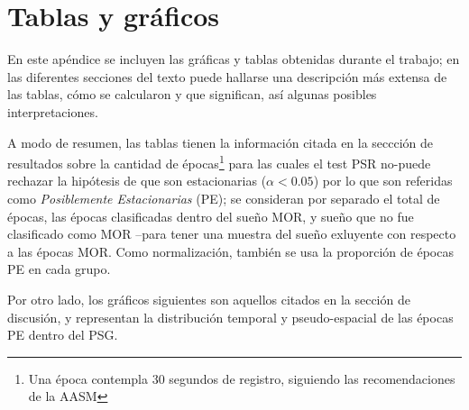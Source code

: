 \chapter{Tablas y gr\'aficos}

En este ap\'endice se incluyen las gr\'aficas y tablas obtenidas durante el trabajo; en las 
diferentes secciones del texto 
puede hallarse una descripci\'on m\'as extensa de las tablas,
c\'omo se
calcularon y que significan, as\'i algunas posibles interpretaciones.

A modo de resumen, las tablas tienen la informaci\'on citada en la seccci\'on de resultados sobre
la cantidad de \'epocas\footnote{Una \'epoca contempla 30 segundos de registro, siguiendo las
recomendaciones de la AASM\cite{AASM07}} para las cuales el test PSR no-puede rechazar la
hip\'otesis de que son estacionarias ($\alpha < 0.05$) por lo que son referidas como
\textit{Posiblemente Estacionarias} (PE); 
se consideran por separado el total de \'epocas, las \'epocas clasificadas dentro del sue\~no MOR,
y sue\~no que no fue clasificado como MOR --para tener una muestra del sue\~no exluyente con 
respecto a las \'epocas MOR.
Como normalizaci\'on, tambi\'en se usa la proporci\'on de \'epocas PE en cada grupo.

Por otro lado, los gr\'aficos siguientes son aquellos citados en la secci\'on de discusi\'on,
y representan la distribuci\'on temporal y pseudo-espacial de las \'epocas PE dentro del PSG.



